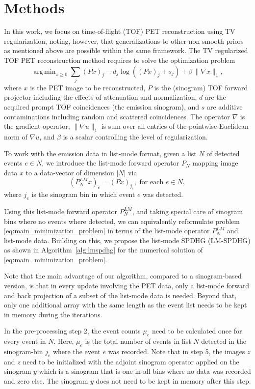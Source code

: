 \documentclass[10pt,twocolumn,twoside,letterpaper]{IEEEtran}
\DeclareMathOperator*{\argmin}{arg\,min}
\begin{document}
\section{Methods}

In this work, we focus on time-of-flight (TOF) PET reconstruction using TV regularization, 
noting, however, that generalizations to other non-smooth priors as mentioned above are possible 
within the same framework. 
The TV regularized TOF PET reconstruction method requires to solve the optimization problem
%
\begin{equation} \label{eq:main_minimization_problem}
\argmin _{x\geq 0} \sum_j (Px)_j -  d_j \log \left( (Px)_ j + s_j \right) + \beta \, \|\nabla x\|_{1},
\end{equation}
%
where $x$ is the PET image to be reconstructed, $P$ is the (sinogram) TOF forward projector including 
the effects of attenuation and normalization, $d$ are the acquired prompt TOF coincidences 
(the emission sinogram), and $s$ are additive contaminations including random and scattered coincidences.
The operator $\nabla$ is the gradient operator, $\|\nabla u \|_1$ is sum over all entries of the 
pointwise Euclidean norm of $\nabla u$, and $\beta$ is a scalar controlling the level of regularization.

To work with the emission data in list-mode format, given a list $N$ of detected events $e \in N$, we introduce the list-mode forward operator $P_N$ mapping image data $x$ to a data-vector of dimension $|N|$ via
\[ (P^{LM}_N x)_e  = (Px)_{j_e} , \text{ for each }e \in N,\]
where $j_e$ is the sinogram bin in which event $e$ was detected.

Using this list-mode forward operator $P^{LM}_N$, and taking special care of sinogram bins where no events where detected, we can equivalently reformulate problem \eqref{eq:main_minimization_problem} in terms of the list-mode operator $P^{LM}_N$ and list-mode data. Building on this, we propose the list-mode SPDHG (LM-SPDHG) as shown in Algorithm~\ref{alg:lmspdhg} for the numerical solution of \eqref{eq:main_minimization_problem}.

Note that the main advantage of our algorithm, compared to a sinogram-based version, is that in every update involving the PET data, only a list-mode forward and back projection of
a subset of the list-mode data is needed. Beyond that, only one additional array with the same length
as the event list needs to be kept in memory during the iterations. 

In the pre-processing step 2, the event counts $\mu_e$ need to be calculated once for every event in $N$. Here, $\mu_{e}$ is the total number of events in list $N$ detected in the sinogram-bin $j_e$ where the event $e$ was recorded.
Note that in step 5, the images $\bar{z}$ and $z$ need to be initialized with the adjoint sinogram
operator applied on the sinogram $y$ which is a sinogram that is one in all bins where no data was
recorded and zero else. The sinogram $y$ does not need to be kept in memory after this step.
\end{document}
